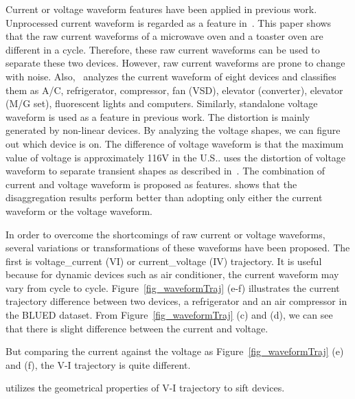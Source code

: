 Current or voltage waveform features have been applied in previous work.
Unprocessed current waveform 
is regarded as a feature in~\cite{suzuki2008nonintrusive}.
This paper shows that 
the raw current waveforms of a microwave oven and a toaster oven 
are different in a cycle. 
Therefore, these raw current waveforms can be used to separate 
these two devices. 
However, raw current waveforms are prone to change with noise.
Also,~\cite{duan2004neural} analyzes the current waveform of eight devices and classifies
them as A/C, refrigerator, compressor, 
fan (VSD), elevator (converter), elevator (M/G set), fluorescent lights 
and computers. 
Similarly, standalone voltage waveform is used as a feature in previous work. 
The distortion is mainly generated by non-linear devices.
By analyzing the voltage shapes,
we can figure out which device is on.
The difference of voltage waveform is that the maximum value of 
voltage is approximately 116V in the U.S.. 
\cite{cox2006transient} uses the distortion of voltage waveform to
separate transient shapes as described in~\cite{srinivasan2006neural}.
The combination of current and voltage waveform is proposed as 
features. 
 \cite{hassan2014empirical} shows that the disaggregation results perform better
 than adopting only either the current waveform or the voltage waveform. 

In order to overcome the shortcomings of raw current or voltage waveforms, 
several variations or transformations of these waveforms have been proposed. 
The first is voltage\_current (V\-I) or current\_voltage (I\-V) trajectory. 
It is useful because for
dynamic devices such as air conditioner,
the current waveform may vary from cycle to cycle.
Figure~\ref{fig_waveformTraj} (e-f) illustrates the current trajectory difference between 
two devices, %
a refrigerator and an air compressor in the BLUED dataset. 
From Figure~\ref{fig_waveformTraj} (c) and (d), 
we can see that there is slight difference between the current and voltage. 
\iffalse
\manishc{not
  clear, do you mean in subfigures (c) and (d), there is a difference in the
  current and voltage waveforms?} \huijuanc{Yes. I mean little difference not much.}
\fi  
But comparing the current against the voltage as Figure~\ref{fig_waveformTraj} (e) and (f), 
the V-I trajectory is quite different. 

\cite{lam2007novel} utilizes 
the geometrical properties of V-I trajectory to sift devices. 
\iffalse
\manishc{some of the figure refs seem to be off, can you verify? also, in fig
  13, (c) should be (d), and can you label the two rows of plots with 'refrigerator' and 'air compressor' 
}\huijuanc{add the label.}
\fi

